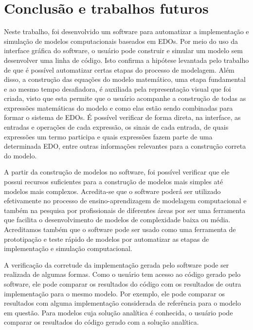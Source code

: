 \documentclass[
	12pt,				%
	openright,			%
	oneside,			%
	a4paper,			%
	main=brazil,
	english,			%
	]{ufsj-abntex2}
\begin{document}
\chapter{Conclusão e trabalhos futuros}
\label{chap:conclusao}

Neste trabalho, foi desenvolvido um software para automatizar a implementação e simulação de modelos computacionais baseados em EDOs. Por meio do uso da interface gráfica do software, o usuário pode construir e simular um modelo sem desenvolver uma linha de código. Isto confirma a hipótese levantada pelo trabalho de que é possível automatizar certas etapas do processo de modelagem. Além disso, a construção das equações do modelo matemático, uma etapa fundamental e ao mesmo tempo desafiadora, é auxiliada pela representação visual que foi criada, visto que esta permite que o usuário acompanhe a construção de todas as expressões matemáticas do modelo e como elas estão sendo combinadas para formar o sistema de EDOs. É possível verificar de forma direta, na interface, as entradas e operações de cada expressão, os sinais de cada entrada, de quais expressões um termo participa e quais expressões fazem parte de uma determinada EDO, entre outras informações relevantes para a construção correta do modelo.   

A partir da construção de modelos no software, foi possível verificar que ele possui recursos suficientes para a construção de modelos mais simples até modelos mais complexos. Acredita-se que o software poderá ser utilizado efetivamente no processo de ensino-aprendizagem de modelagem computacional e também na pesquisa por profissionais de diferentes áreas por ser uma ferramenta que facilita o desenvolvimento de modelos de complexidade baixa ou média. Acreditamos também que o software pode ser usado como uma ferramenta de prototipação e teste rápido de modelos por automatizar as etapas de implementação e simulação computacional.

A verificação da corretude da implementação gerada pelo software pode ser realizada de algumas formas. Como o usuário tem acesso ao código gerado pelo software, ele pode comparar os resultados do código com os resultados de outra implementação para o mesmo modelo. Por exemplo, ele pode comparar os resultados com alguma implementação considerada de referência para o modelo em questão. Para modelos cuja solução analítica é conhecida, o usuário pode comparar os resultados do código gerado com a solução analítica.
\end{document}
